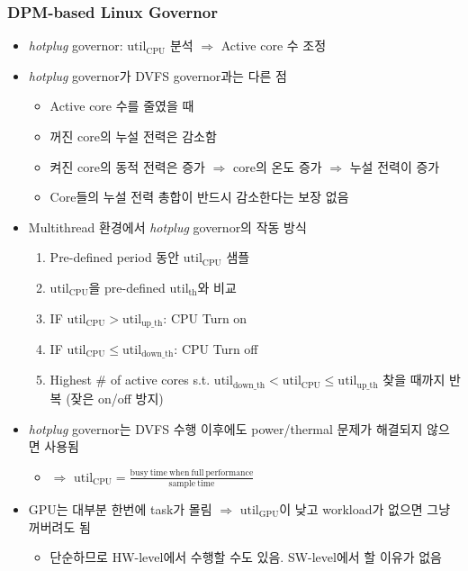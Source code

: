 \subsubsection*{DPM-based Linux Governor}
\begin{itemize}
    \item \textit{hotplug} governor: $\mathrm{util_{CPU}}$ 분석 $\Rightarrow$ Active core 수 조정
    \item \textit{hotplug} governor가 DVFS governor과는 다른 점
    \begin{itemize}
        \item Active core 수를 줄였을 때
        \item 꺼진 core의 누설 전력은 감소함
        \item 켜진 core의 동적 전력은 증가 $\Rightarrow$ core의 온도 증가 $\Rightarrow$ 누설 전력이 증가
        \item Core들의 누설 전력 총합이 반드시 감소한다는 보장 없음
    \end{itemize}
    \item Multithread 환경에서 \textit{hotplug} governor의 작동 방식
    \begin{enumerate}
        \item Pre-defined period 동안 $\mathrm{util_{CPU}}$ 샘플
        \item $\mathrm{util_{CPU}}$을 pre-defined $\mathrm{util_{th}}$와 비교
        \item IF $\mathrm{util_{CPU}} > \mathrm{util_{up\_th}}$: CPU Turn on
        \item IF $\mathrm{util_{CPU}} \leq \mathrm{util_{down\_th}}$: CPU Turn off
        \item Highest \# of active cores s.t. $\mathrm{util_{down\_th}}<\mathrm{util_{CPU}}\leq\mathrm{util_{up\_th}}$ 찾을 때까지 반복 (잦은 on/off 방지)
    \end{enumerate}
    \item \textit{hotplug} governor는 DVFS 수행 이후에도 power/thermal 문제가 해결되지 않으면 사용됨
    \begin{itemize}
        \item $\Rightarrow$ $\mathrm{util_{CPU} = \frac{busy~time~when~full~performance}{sample~time}}$
    \end{itemize}
    \item GPU는 대부분 한번에 task가 몰림 $\Rightarrow$ $\mathrm{util_{GPU}}$이 낮고 workload가 없으면 그냥 꺼버려도 됨
    \begin{itemize}
        \item 단순하므로 HW-level에서 수행할 수도 있음. SW-level에서 할 이유가 없음
    \end{itemize}
\end{itemize}

